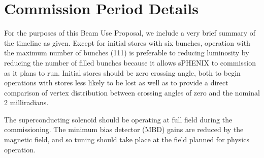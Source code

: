 \section{Commission Period Details}

For the purposes of this Beam Use Proposal, we include a very brief
summary of the timeline as given.  Except for initial stores with six
bunches, operation with the maximum number of bunches (111) is
preferable to reducing luminosity by reducing the number of filled
bunches because it allows sPHENIX to commission as it plans to run.
Initial stores should be zero crossing angle, both to begin operations
with stores less likely to be lost as well as to provide a direct
comparison of vertex distribution between crossing angles of zero and
the nominal 2 milliradians.

The superconducting solenoid should be operating at full field during
the commissioning.  The minimum bias detector (MBD) gains are reduced
by the magnetic field, and so tuning should take place at the field
planned for physics operation.

